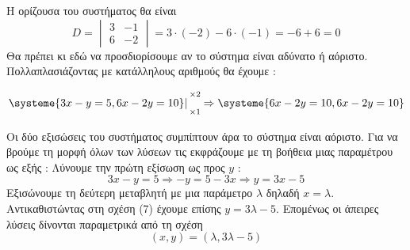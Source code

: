 \documentclass[twoside,nofonts,internet,methodoi]{thewria}
\newcommand{\synt}[2]{{\scriptsize \begin{matrix}
\times#1\\\\ \times#2
\end{matrix}}}
\begin{document}
Η ορίζουσα του συστήματος θα είναι
\[ D=\begin{vmatrix}
3& -1\\6 & -2
\end{vmatrix}=3\cdot(-2)-6\cdot(-1)=-6+6=0 \]
Θα πρέπει κι εδώ να προσδιορίσουμε αν το σύστημα είναι αδύνατο ή αόριστο. Πολλαπλασιάζοντας με κατάλληλους αριθμούς θα έχουμε :
\begin{center}
\vspace{-5mm}
\begin{equation}
\left.\displaystyle\systeme{3x-y=5,6x-2y=10}\right| \synt{2}{1}\Rightarrow  \displaystyle\systeme{6x-2y=10,6x-2y=10} 
\end{equation}
\end{center}
Οι δύο εξισώσεις του συστήματος συμπίπτουν άρα το σύστημα είναι αόριστο. Για να βρούμε τη μορφή όλων των λύσεων τις εκφράζουμε με τη βοήθεια μιας παραμέτρου ως εξής : 
Λύνουμε την πρώτη εξίσωση ως προς $ y $ : 
\begin{equation} 
3x-y=5\Rightarrow -y=5-3x\Rightarrow y=3x-5 
\end{equation}
Εξισώνουμε τη δεύτερη μεταβλητή με μια παράμετρο $ \lambda $ δηλαδή $ x=\lambda $. Αντικαθιστώντας στη σχέση (7) έχουμε επίσης $ y=3\lambda-5 $. Επομένως οι άπειρες λύσεις δίνονται παραμετρικά από τη σχέση \[ (x,y)=(\lambda,3\lambda-5) \]
\end{document}
